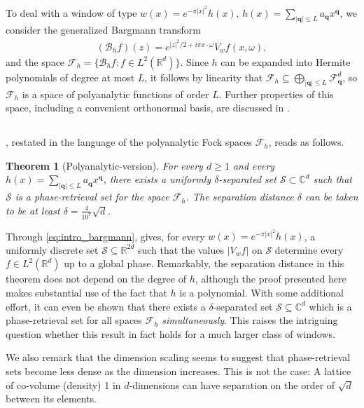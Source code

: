 \documentclass[11pt]{amsart}
\newtheorem{theorem}{Theorem}[section]
\newcommand{\C}{\mathbb C}
\newcommand{\R}{\mathbb R}
\newcommand{\F}{\mathcal F}
\begin{document}
To deal with a window of type $w(x) = e^{-\pi |x|^2} h(x)$, $h(x) = \sum_{|\mathbf q| \leq L} a_{\mathbf q} x^{\mathbf q}$, we consider the generalized Bargmann transform
\begin{align}
    \label{eq:intro_bargmann}
    (\mathcal B_{h}f)(z)
        = e^{|z|^2/2+i\pi x\cdot\omega}V_{w}f(x,\omega),
\end{align}
and the space $\mathcal F_h = \{\mathcal B_{h}f: f \in L^2(\mathbb R^d)\}$. Since $h$ can be expanded into Hermite polynomials of degree at most $L$, it follows by linearity that $\mathcal F_h \subseteq \bigoplus_{|\mathbf q| \leq L} \mathcal F_{\mathbf q}^d$, so $ \mathcal F_h $ is a space of polyanalytic functions of order $L$. Further properties of this space, including a convenient orthonormal basis, are discussed in .

\subsection{}\label{sec:rest} , restated in the language of the polyanalytic Fock spaces $\mathcal F_h$, reads as follows.

\setcounter{theorem}{0}
\begin{theorem}[Polyanalytic-version]\label{thm:main}
For every \(d\ge 1\) and every $h(x) = \sum_{|\mathbf q| \leq L} a_{\mathbf q} x^{\mathbf q}$, there exists a uniformly $\delta$-separated set \(\mathcal S \subset\C^d\) such that \(\mathcal S\) is a phase-retrieval set for the space \(\F_{h}\). The separation distance $\delta$ can be taken to be at least $\delta = \frac{4}{10^7} \sqrt{d}$.
\end{theorem}

Through \eqref{eq:intro_bargmann},  gives, for every $w(x) = e^{-\pi |x|^2} h(x)$, a uniformly discrete set $\mathcal S\subseteq\R^{2d}$ such that the values $|V_{w}f|$ on $\mathcal S$ determine every $f\in L^2(\R^d)$ up to a global phase.
Remarkably, the separation distance in this theorem does not depend on the degree of $h$, although the proof presented here makes substantial use of the fact that $h$ is a polynomial. With some additional effort, it can even be shown that there exists a $\delta$-separated set $\mathcal S \subseteq \mathbb C^d$ which is a phase-retrieval set for all spaces $\mathcal F_h$ \emph{simultaneously}. This raises the intriguing question whether this result in fact holds for a much larger class of windows.

We also remark that the dimension scaling seems to suggest that phase-retrieval sets become less dense as the dimension increases. This is not the case: A lattice of co-volume (density) 1 in $d$-dimensions can have separation on the order of $\sqrt{d}$ between its elements.
\end{document}
